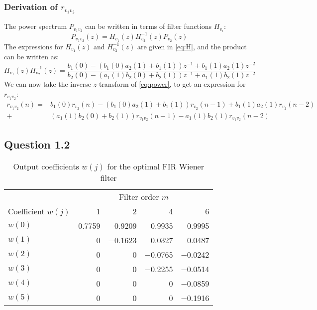 \documentclass[12pt,a4paper]{article}
\begin{document}
\subsubsection*{Derivation of $r_{v_{1}v_{2}}$}
The power spectrum $P_{v_1v_2}$ can be written in terms of filter functions $H_{v_i}$:
\begin{equation}\label{eq:power}
P_{v_1v_2}(z) = H_{v_1}(z)H^{-1}_{v_2}(z)P_{v_2}(z)
\end{equation}
The expressions for $H_{v_1}(z)$ and $H^{-1}_{v_2}(z)$ are given in \autoref{eq:H}, and the product can be written as:
\begin{equation}\label{eq:HH-1}
H_{v_1}(z)H^{-1}_{v_2}(z) = \frac{b_1(0) - (b_1(0)a_2(1) + b_1(1))z^{-1} + b_1(1)a_2(1)z^{-2}}{b_2(0) - (a_1(1)b_2(0) + b_2(1))z^{-1} + a_1(1)b_2(1)z^{-2}}
\end{equation}
We can now take the inverse $z$-transform of \autoref{eq:power}, to get an expression for $r_{v_{1}v_{2}}$:
\begin{align*}\label{eq:rv1v2}
r_{v_{1}v_{2}}(n) = &b_1(0)r_{v_2}(n) - (b_1(0)a_2(1) + b_1(1))r_{v_2}(n-1) + b_1(1)a_2(1)r_{v_2}(n-2)\\
+ &(a_1(1)b_2(0) + b_2(1)) r_{v_{1}v_{2}}(n-1) - a_1(1)b_2(1)r_{v_{1}v_{2}}(n-2)
\end{align*}


\subsection*{Question 1.2}
\label{code1}

\begin{table}[h!]
\centering
\caption{Output coefficients $w(j)$ for the optimal FIR Wiener filter}
\begin{tabular}{l r r r r}
\hline
 & \multicolumn{4}{c}{Filter order $m$}\\
 \cline{2-5}
Coefficient $w(j)$ & \num{1} & \num{2} & \num{4} & \num{6} \\
\hline
$w(0)$ & \num{0.7759} & \num{0.9209}& \num{0.9935} & \num{0.9995} \\
$w(1)$ & \num{0} & \num{-0.1623}& \num{0.0327}& \num{0.0487} \\
$w(2)$ & \num{0}& \num{0}& \num{-0.0765}& \num{-0.0242}\\
$w(3)$ & \num{0}& \num{0}& \num{-0.2255}& \num{-0.0514}\\
$w(4)$ & \num{0}& \num{0}& \num{0}& \num{-0.0859}\\
$w(5)$ & \num{0}& \num{0}& \num{0}& \num{-0.1916}\\
\hline
\end{tabular}
\end{table}
\end{document}
